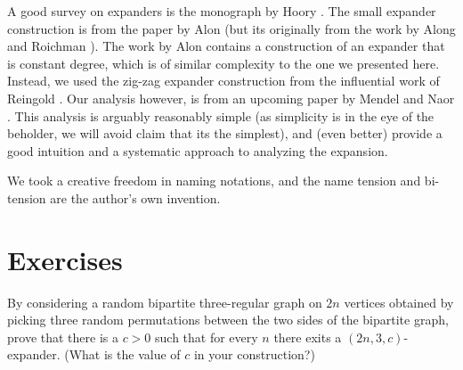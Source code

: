 A good survey on expanders is the monograph by Hoory \etal
\cite{hlw-egta-06}. The small expander construction is from the paper
by Alon \etal \cite{ass-eccde-08} (but its originally from the work by
Along and Roichman \cite{ar-rcge-94}). The work by Alon \etal
\cite{ass-eccde-08} contains a construction of an expander that is
constant degree, which is of similar complexity to the one we
presented here. Instead, we used the zig-zag expander construction
from the influential work of Reingold \etal \cite{rvw-ewzzg-02}. Our
analysis however, is from an upcoming paper by Mendel and Naor
\cite{mn-tcnls-08}. This analysis is arguably reasonably simple (as
simplicity is in the eye of the beholder, we will avoid claim that its
the simplest), and (even better) provide a good intuition and a
systematic approach to analyzing the expansion.

We took a creative freedom in naming notations, and the name tension
and bi-tension are the author's own invention.


\section{Exercises}

\begin{exercise}
    By considering a random bipartite three-regular graph on $2n$
    vertices obtained by picking three random permutations between the
    two sides of the bipartite graph, prove that there is a $c>0$ such
    that for every $n$ there exits a $(2n,3,c)$-expander. (What is the
    value of $c$ in your construction?)
\end{exercise}


